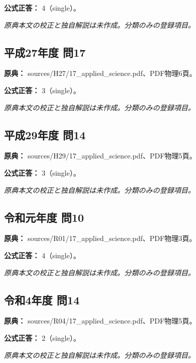 \textbf{公式正答：} 4（single）。

\par\textit{原典本文の校正と独自解説は未作成。分類のみの登録項目。}

\subsection{平成27年度 問17}
\label{q:h27-reg-applied-17}

\noindent\textbf{原典：} sources/H27/17\_applied\_science.pdf、PDF物理6頁。

\textbf{公式正答：} 3（single）。

\par\textit{原典本文の校正と独自解説は未作成。分類のみの登録項目。}

\subsection{平成29年度 問14}
\label{q:h29-reg-applied-14}

\noindent\textbf{原典：} sources/H29/17\_applied\_science.pdf、PDF物理5頁。

\textbf{公式正答：} 3（single）。

\par\textit{原典本文の校正と独自解説は未作成。分類のみの登録項目。}

\subsection{令和元年度 問10}
\label{q:r01-reg-applied-10}

\noindent\textbf{原典：} sources/R01/17\_applied\_science.pdf、PDF物理3頁。

\textbf{公式正答：} 4（single）。

\par\textit{原典本文の校正と独自解説は未作成。分類のみの登録項目。}

\subsection{令和4年度 問14}
\label{q:r04-reg-applied-14}

\noindent\textbf{原典：} sources/R04/17\_applied\_science.pdf、PDF物理5頁。

\textbf{公式正答：} 2（single）。

\par\textit{原典本文の校正と独自解説は未作成。分類のみの登録項目。}

